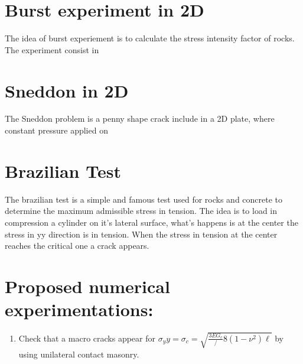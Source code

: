 \documentclass[10pt,oneside]{memoir}
\begin{document}
\section{Burst experiment in 2D}
The idea of burst experiement is to calculate the stress intensity factor of rocks. The experiment consist in


\section{Sneddon in 2D}
The Sneddon problem is a penny shape crack include in a 2D plate, where constant pressure applied on



\section{Brazilian Test}
The brazilian test is a simple and famous test used for rocks and concrete to determine the maximum admissible stress in tension. The idea is to load in compression a cylinder on it’s lateral surface, what’s happens is at the center the stress in yy direction is in tension. When the stress in tension at the center reaches the critical one a crack appears.
\section*{Proposed numerical experimentations:}
\begin{enumerate}
\item Check that a macro cracks appear for $\sigma_yy = \sigma_c =  \sqrt{\frac{3EG_c}/{8(1-\nu^2)\ell}} $ by using unilateral contact masonry.
\end{enumerate}




\end{document}

